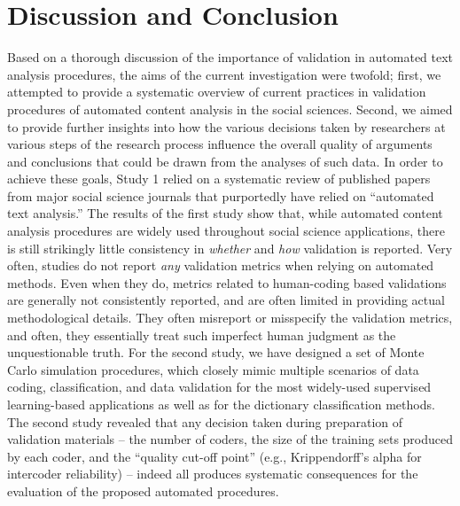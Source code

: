 \documentclass[man, floatsintext, 12pt, a4paper, noextraspace]{apa6}
\begin{document}
\section{Discussion and Conclusion}
    
    Based on a thorough discussion of the importance of validation in automated text analysis procedures, the aims of the current investigation were twofold; first, we attempted to provide a systematic overview of current practices in validation procedures of automated content analysis in the social sciences. Second, we aimed to provide further insights into how the various decisions taken by researchers at various steps of the research process influence the overall quality of arguments and conclusions that could be drawn from the analyses of such data. In order to achieve these goals, Study 1 relied on a systematic review of published papers from major social science journals that purportedly have relied on \enquote{automated text analysis.} The results of the first study show that, while automated content analysis procedures are widely used throughout social science applications, there is still strikingly little consistency in \textit{whether} and \textit{how} validation is reported. Very often, studies do not report \textit{any} validation metrics when relying on automated methods. Even when they do, metrics related to human-coding based validations are generally not consistently reported, and are often limited in providing actual methodological details. They often misreport or misspecify the validation metrics, and often, they essentially treat such imperfect human judgment as the unquestionable truth. For the second study, we have designed a set of Monte Carlo simulation procedures, which closely mimic multiple scenarios of data coding, classification, and data validation for the most widely-used supervised learning-based applications as well as for the dictionary classification methods. The second study revealed that any decision taken during preparation of validation materials -- the number of coders, the size of the training sets produced by each coder, and the \enquote{quality cut-off point} (e.g., Krippendorff's alpha for intercoder reliability) -- indeed all produces systematic consequences for the evaluation of the proposed automated procedures. 
\end{document}
